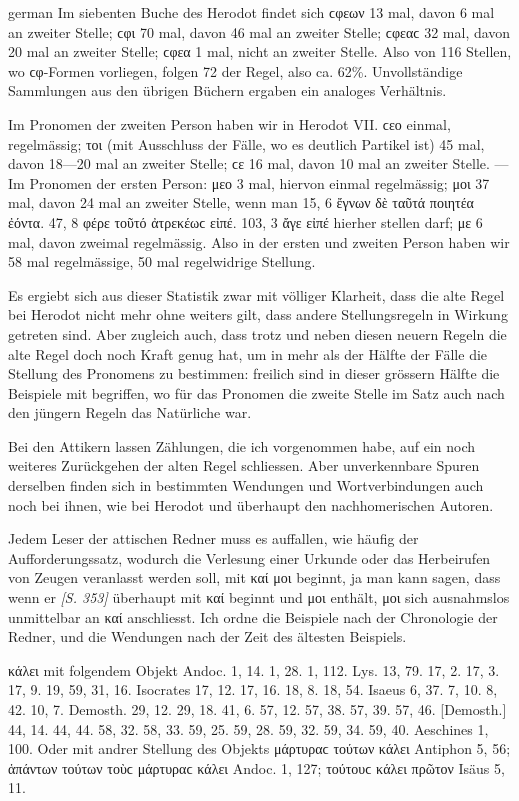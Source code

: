 \begin{otherlanguage*}{german}
Im siebenten Buche des Herodot findet sich ϲφεων 13 mal, davon 6 mal an zweiter Stelle; ϲφι 70 mal, davon 46 mal an zweiter Stelle; ϲφεαϲ 32 mal, davon 20 mal an zweiter Stelle; ϲφεα 1 mal, nicht an zweiter Stelle. Also von 116 Stellen, wo ϲφ-Formen vorliegen, folgen 72 der Regel, also ca. 62\%. Unvollständige Sammlungen aus den übrigen Büchern ergaben ein analoges Verhältnis.

Im Pronomen der zweiten Person haben wir in Herodot VII. ϲεο einmal, regelmässig; τοι (mit Ausschluss der Fälle, wo es deutlich Partikel ist) 45 mal, davon 18—20 mal an zweiter Stelle; ϲε 16 mal, davon 10 mal an zweiter Stelle. — Im Pronomen der ersten Person: μεο 3 mal, hiervon einmal regelmässig; μοι 37 mal, davon 24 mal an zweiter Stelle, wenn man 15, 6 ἔγνων δὲ ταῦτά  ποιητέα ἐόντα. 47, 8 φέρε τοῦτό  ἀτρεκέωϲ εἰπέ. 103, 3 ἄγε εἰπέ  hierher stellen darf; με 6 mal, davon zweimal regelmässig. Also in der ersten und zweiten Person haben wir 58 mal regelmässige, 50 mal regelwidrige Stellung.

Es ergiebt sich aus dieser Statistik zwar mit völliger Klarheit, dass die alte Regel bei Herodot nicht mehr ohne weiters gilt, dass andere Stellungsregeln in Wirkung getreten sind. Aber zugleich auch, dass trotz und neben diesen neuern Regeln die alte Regel doch noch Kraft genug hat, um in mehr als der Hälfte der Fälle die Stellung des Pronomens zu bestimmen: freilich sind in dieser grössern Hälfte die Beispiele mit begriffen, wo für das Pronomen die zweite Stelle im Satz auch nach den jüngern Regeln das Natürliche war.

Bei den Attikern lassen Zählungen, die ich vorgenommen habe, auf ein noch weiteres Zurückgehen der alten Regel schliessen. Aber unverkennbare Spuren derselben finden sich in bestimmten Wendungen und Wortverbindungen auch noch bei ihnen, wie bei Herodot und überhaupt den nachhomerischen Autoren.

Jedem Leser der attischen Redner muss es auffallen, wie häufig der Aufforderungssatz, wodurch die Verlesung einer Urkunde oder das Herbeirufen von Zeugen veranlasst werden soll, mit καί μοι beginnt, ja man kann sagen, dass wenn er \hypertarget{p353}{\emph{[S. 353]}}\label{p353} überhaupt mit καί beginnt und μοι enthält, μοι sich ausnahmslos unmittelbar an καί anschliesst. Ich ordne die Beispiele nach der Chronologie der Redner, und die Wendungen nach der Zeit des ältesten Beispiels.

 κάλει mit folgendem Objekt Andoc. 1, 14. 1, 28. 1, 112. Lys. 13, 79. 17, 2. 17, 3. 17, 9. 19, 59, 31, 16. Isocrates 17, 12. 17, 16. 18, 8. 18, 54. Isaeus 6, 37. 7, 10. 8, 42. 10, 7. Demosth. 29, 12. 29, 18. 41, 6. 57, 12. 57, 38. 57, 39. 57, 46. [Demosth.] 44, 14. 44, 44. 58, 32. 58, 33. 59, 25. 59, 28. 59, 32. 59, 34. 59, 40. Aeschines 1, 100. Oder mit andrer Stellung des Objekts  μάρτυραϲ τούτων κάλει Antiphon 5, 56;  ἁπάντων τούτων τοὺϲ μάρτυραϲ κάλει Andoc. 1, 127;  τούτουϲ κάλει πρῶτον Isäus 5, 11.


\end{otherlanguage*}
